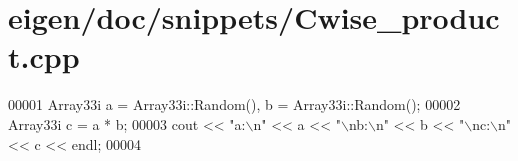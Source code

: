 \hypertarget{eigen_2doc_2snippets_2_cwise__product_8cpp_source}{}\section{eigen/doc/snippets/\+Cwise\+\_\+product.cpp}
\label{eigen_2doc_2snippets_2_cwise__product_8cpp_source}

\begin{DoxyCode}
00001 Array33i a = Array33i::Random(), b = Array33i::Random();
00002 Array33i c = a * b;
00003 cout << \textcolor{stringliteral}{"a:\(\backslash\)n"} << a << \textcolor{stringliteral}{"\(\backslash\)nb:\(\backslash\)n"} << b << \textcolor{stringliteral}{"\(\backslash\)nc:\(\backslash\)n"} << c << endl;
00004 
\end{DoxyCode}
